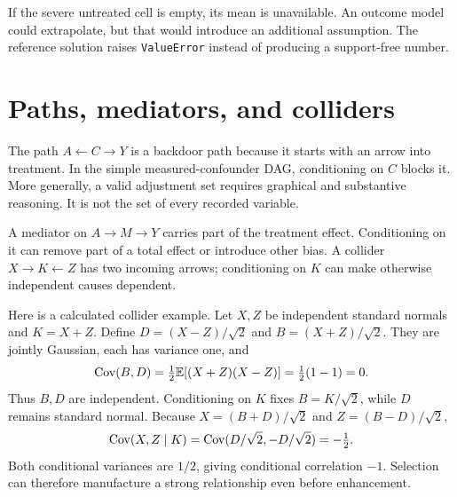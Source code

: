 \documentclass[11pt,oneside]{scrbook}
\begin{document}
If the severe untreated cell is empty, its mean is unavailable. An outcome model could
extrapolate, but that would introduce an additional assumption. The reference solution
raises \texttt{ValueError} instead of producing a support-free number.

\section{Paths, mediators, and colliders}
The path $A\leftarrow C\rightarrow Y$ is a backdoor path because it starts with an
arrow into treatment. In the simple measured-confounder DAG, conditioning on $C$
blocks it. More generally, a valid adjustment set requires graphical and substantive
reasoning. It is not the set of every recorded variable.

A mediator on $A\rightarrow M\rightarrow Y$ carries part of the treatment effect.
Conditioning on it can remove part of a total effect or introduce other bias. A collider
$X\rightarrow K\leftarrow Z$ has two incoming arrows; conditioning on $K$ can make
otherwise independent causes dependent.

Here is a calculated collider example. Let $X,Z$ be independent standard normals and
$K=X+Z$. Define $D=(X-Z)/\sqrt{2}$ and $B=(X+Z)/\sqrt{2}$. They are jointly Gaussian,
each has variance one, and
\[
\operatorname{Cov}(B,D)=\tfrac12\mathbb{E}[(X+Z)(X-Z)]=\tfrac12(1-1)=0.
\]
Thus $B,D$ are independent. Conditioning on $K$ fixes $B=K/\sqrt2$, while $D$
remains standard normal. Because $X=(B+D)/\sqrt2$ and $Z=(B-D)/\sqrt2$,
\[
\operatorname{Cov}(X,Z\mid K)=\operatorname{Cov}(D/\sqrt2,-D/\sqrt2)=-\tfrac12.
\]
Both conditional variances are $1/2$, giving conditional correlation $-1$.
Selection can therefore manufacture a strong relationship even before enhancement.
\end{document}

